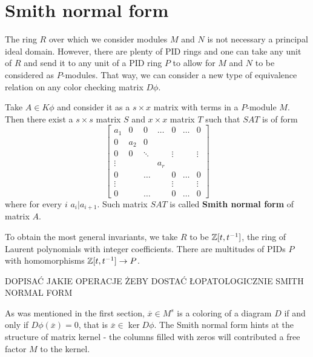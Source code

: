 \section{Smith normal form}

%
The ring $R$ over which we consider modules $M$ and $N$ is not necessary a principal ideal domain. However, there are plenty of PID rings and one can take any unit of $R$ and send it to any unit of a PID ring $P$ to allow for $M$ and $N$ to be considered as $P$-modules. That way, we can consider a new type of equivalence relation on any color checking matrix $D\phi$.
\begin{definition}
Take $A\in K\phi$ and consider it as a $s\times x$ matrix with terms in a $P$-module $M$. Then there exist a $s\times s$ matrix $S$ and $x\times x$ matrix $T$ such that $SAT$ is of form
$$
\begin{bmatrix}
  a_1 & 0 & 0 & \hdots & 0 & \hdots & 0 \\ 
  0 & a_2 & 0\\ 
  0 & 0 & \ddots & & \vdots & & \vdots\\ 
  \vdots & & & a_r\\ 
  0 & & \hdots & & 0 & \hdots & 0 \\ 
  \vdots & & & & \vdots & & \vdots\\ 
  0 & & \hdots & & 0 & \hdots & 0
\end{bmatrix}
$$
where for every $i$ $a_i|a_{i+1}$. Such matrix $SAT$ is called \textbf{Smith normal form} of matrix $A$.
\end{definition}
{\color{blue}
To obtain the most general invariants, we take $R$ to be $\operatorname{\mathbb{Z}}[t, t^{-1}]$, the ring of Laurent polynomials with integer coefficients. There are multitudes of PIDs $P$ with homomorphisms $\operatorname{\mathbb{Z}}[t, t^{-1}]\to P$.
}

{
  \color{red}\large 
  DOPISAĆ JAKIE OPERACJE ŻEBY DOSTAĆ ŁOPATOLOGICZNIE SMITH NORMAL FORM
}

As was mentioned in the first section, $\overline{x}\in M^s$ is a coloring of a diagram $D$ if and only if $D\phi(\overline{x})=0$, that is $\overline{x}\in\ker D\phi$. The Smith normal form hints at the structure of matrix kernel - the columns filled with zeros will contributed a free factor $M$ to the kernel. 

